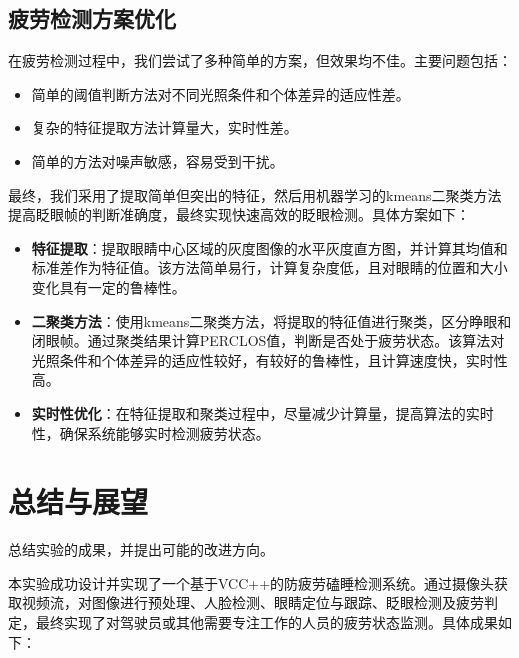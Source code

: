 \documentclass[12pt,hyperref,a4paper,UTF8]{ctexart}
\begin{document}
\subsection{疲劳检测方案优化}

在疲劳检测过程中，我们尝试了多种简单的方案，但效果均不佳。主要问题包括：
\begin{itemize}
    \item 简单的阈值判断方法对不同光照条件和个体差异的适应性差。
    \item 复杂的特征提取方法计算量大，实时性差。
    \item 简单的方法对噪声敏感，容易受到干扰。
\end{itemize}

最终，我们采用了提取简单但突出的特征，然后用机器学习的kmeans二聚类方法提高眨眼帧的判断准确度，最终实现快速高效的眨眼检测。具体方案如下：
\begin{itemize}
    \item \textbf{特征提取}：提取眼睛中心区域的灰度图像的水平灰度直方图，并计算其均值和标准差作为特征值。该方法简单易行，计算复杂度低，且对眼睛的位置和大小变化具有一定的鲁棒性。
    \item \textbf{二聚类方法}：使用kmeans二聚类方法，将提取的特征值进行聚类，区分睁眼和闭眼帧。通过聚类结果计算PERCLOS值，判断是否处于疲劳状态。该算法对光照条件和个体差异的适应性较好，有较好的鲁棒性，且计算速度快，实时性高。
    \item \textbf{实时性优化}：在特征提取和聚类过程中，尽量减少计算量，提高算法的实时性，确保系统能够实时检测疲劳状态。
\end{itemize}


\newpage
\section{总结与展望}
总结实验的成果，并提出可能的改进方向。

本实验成功设计并实现了一个基于VCC++的防疲劳磕睡检测系统。通过摄像头获取视频流，对图像进行预处理、人脸检测、眼睛定位与跟踪、眨眼检测及疲劳判定，最终实现了对驾驶员或其他需要专注工作的人员的疲劳状态监测。具体成果如下：
\end{document}
